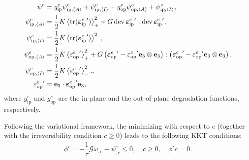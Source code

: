 \begin{subequations}
  \begin{align}
    \psi^e                            & =  g^e_\text{ip} \psi^e_{\text{ip}, {\left< A \right>}} + \psi^e_{\text{ip}, {\left< I \right>}} + g^e_\text{op} \psi^e_{\text{op}, {\left< A \right>}} + \psi^e_{\text{ip}, {\left< I \right>}},                                                                           \\
    \psi^e_{\text{ip}, {\left< A \right>}}   & = \dfrac{1}{2} K \left<\operatorname{tr}({\boldsymbol{\varepsilon}^e_\text{ip}}')\right>_+^2 + G \operatorname{dev}{{\boldsymbol{\varepsilon}^e_\text{ip}}'} : \operatorname{dev}{{\boldsymbol{\varepsilon}^e_\text{ip}}'},                                                                                                                        \\
    \psi^e_{\text{ip}, {\left< I \right>}} & = \dfrac{1}{2} K \left<\operatorname{tr}({\boldsymbol{\varepsilon}^e_\text{ip}}')\right>_-^2,                                                                                                                                                                                        \\
    \psi^e_{\text{op}, {\left< A \right>}}   & = \dfrac{1}{2} K \left<{\varepsilon^e_\text{op}}'\right>_+^2 + G \left( {\boldsymbol{\varepsilon}^e_\text{op}}' - {\varepsilon^e_\text{op}}' \textbf{e}_3 \otimes \textbf{e}_3 \right) : \left( {\boldsymbol{\varepsilon}^e_\text{op}}' - {\varepsilon^e_\text{op}}' \textbf{e}_3 \otimes \textbf{e}_3 \right), \\
    \psi^e_{\text{op}, {\left< I \right>}} & = \dfrac{1}{2} K \left<{\varepsilon^e_\text{op}}'\right>_-^2.,                                                                                                                                                                                        \\
    {\varepsilon^e_\text{op}}'        & = \textbf{e}_3 \cdot {\boldsymbol{\varepsilon}^e_\text{op}}' \textbf{e}_3,                                                                                                                                                                                                       
  \end{align}
\end{subequations}
where $g^e_\text{ip}$ and $g^e_\text{op}$ are the in-plane and the out-of-plane degradation functions, respectively.

Following the variational framework, the minimizing with respect to $c$ (together with the irreversibility condition $\dot{c} \geqslant 0$) leads to the following KKT conditions:
\begin{align}
  \phi^i = - \dfrac{1}{\tau} \mathcal{G} \omega_{,c} - \psi^e_{,c} \leqslant 0, \quad \dot{c} \geqslant 0, \quad \phi^i \dot{c} = 0.
\end{align}


